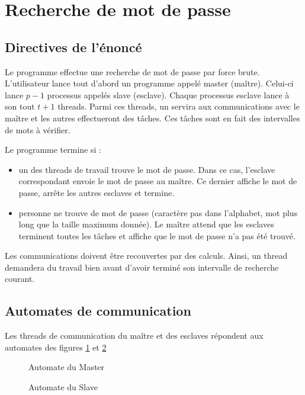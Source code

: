 \section{Recherche de mot de passe} %
\label{sec:recherche_de_mot_de_passe}

\subsection{Directives de l'énoncé} %
\label{sub:enonce}

Le programme effectue une recherche de mot de passe par force brute. L'utilisateur lance tout d'abord un programme appelé master (maître). Celui-ci lance $p-1$ processus appelés slave (esclave). Chaque processus esclave lance à son tout $t+1$ threads. Parmi ces threads, un servira aux communications avec le maître et les autres effectueront des tâches. Ces tâches sont en fait des intervalles de mots à vérifier. 

Le programme termine si :
\begin{itemize}
	\item un des threads de travail trouve le mot de passe. Dans ce cas, l'esclave correspondant envoie le mot de passe au maître. Ce dernier affiche le mot de passe, arrête les autres esclaves et termine.
	\item personne ne trouve de mot de passe (caractère pas dans l'alphabet, mot plus long que la taille maximum donnée). Le maître attend que les esclaves terminent toutes les tâches et affiche que le mot de passe n'a pas été trouvé.
\end{itemize}

Les communications doivent être recouvertes par des calculs. Ainsi, un thread demandera du travail bien avant d'avoir terminé son intervalle de recherche courant.

\subsection{Automates de communication} %
\label{sub:automates_de_communication}

Les threads de communication du maître et des esclaves répondent aux automates des figures \ref{fig:master} et \ref{fig:slave}

\begin{figure}[h!]
\centering
\caption{Automate du Master}
\label{fig:master}
\end{figure}


\begin{figure}[h!]
\centering
\caption{Automate du Slave}
\label{fig:slave}
\end{figure}
